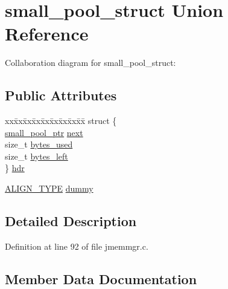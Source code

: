 \hypertarget{unionsmall__pool__struct}{}\section{small\+\_\+pool\+\_\+struct Union Reference}
\label{unionsmall__pool__struct}


Collaboration diagram for small\+\_\+pool\+\_\+struct\+:
\subsection*{Public Attributes}
\begin{DoxyCompactItemize}
\item 
\begin{tabbing}
xx\=xx\=xx\=xx\=xx\=xx\=xx\=xx\=xx\=\kill
struct \{\\
\>\mbox{\hyperlink{jmemmgr_8c_a589d78516510f4b5a5d44e28debeab4d}{small\_pool\_ptr}} \mbox{\hyperlink{unionsmall__pool__struct_a35adccff412d109347d363744d0bcd19}{next}}\\
\>size\_t \mbox{\hyperlink{unionsmall__pool__struct_abe8273ffbd9403c060714752d28ef95f}{bytes\_used}}\\
\>size\_t \mbox{\hyperlink{unionsmall__pool__struct_aa664b607d7abb157024ea55a4bf12b8f}{bytes\_left}}\\
\} \mbox{\hyperlink{unionsmall__pool__struct_aa49a2258b7552bf5ec0302434d862fbf}{hdr}}\\

\end{tabbing}\item 
\mbox{\hyperlink{jmemmgr_8c_a4781c052bb138f69ef6d60737fd569e3}{A\+L\+I\+G\+N\+\_\+\+T\+Y\+PE}} \mbox{\hyperlink{unionsmall__pool__struct_a73cdd7a86eb8b88c7e4e9ff91aee3f99}{dummy}}
\end{DoxyCompactItemize}


\subsection{Detailed Description}


Definition at line 92 of file jmemmgr.\+c.



\subsection{Member Data Documentation}
\mbox{\label{unionsmall__pool__struct_aa664b607d7abb157024ea55a4bf12b8f}} 
